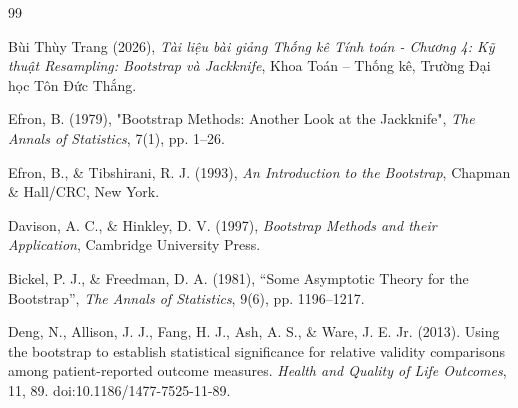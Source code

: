 	\renewcommand{\refname}{Tài liệu tham khảo}
\begin{thebibliography}{99}
		
		Bùi Thùy Trang (2026), \textit{Tài liệu bài giảng Thống kê Tính toán - Chương 4: Kỹ thuật Resampling: Bootstrap và Jackknife}, Khoa Toán – Thống kê, Trường Đại học Tôn Đức Thắng.
		
		Efron, B. (1979), "Bootstrap Methods: Another Look at the Jackknife", \textit{The Annals of Statistics}, 7(1), pp. 1–26.
		
		Efron, B., \& Tibshirani, R. J. (1993), \textit{An Introduction to the Bootstrap}, Chapman \& Hall/CRC, New York.
		
		Davison, A. C., \& Hinkley, D. V. (1997), \textit{Bootstrap Methods and their Application}, Cambridge University Press.
		
		Bickel, P. J., \& Freedman, D. A. (1981),
		``Some Asymptotic Theory for the Bootstrap'',
		\textit{The Annals of Statistics}, 9(6), pp. 1196--1217.
		
		Deng, N., Allison, J. J., Fang, H. J., Ash, A. S., \& Ware, J. E. Jr. (2013).
		Using the bootstrap to establish statistical significance for relative
		validity comparisons among patient-reported outcome measures.
		\textit{Health and Quality of Life Outcomes}, 11, 89.
		doi:10.1186/1477-7525-11-89.
		
	\end{thebibliography}
